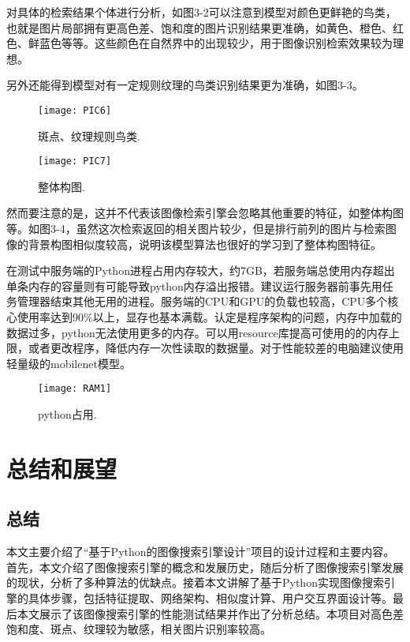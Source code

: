 \documentclass[bachelor_p]{hdu-thesis}
\begin{document}
对具体的检索结果个体进行分析，如图3-2可以注意到模型对颜色更鲜艳的鸟类，也就是图片局部拥有更高色差、饱和度的图片识别结果更准确，如黄色、橙色、红色、鲜蓝色等等。这些颜色在自然界中的出现较少，用于图像识别检索效果较为理想。

另外还能得到模型对有一定规则纹理的鸟类识别结果更为准确，如图3-3。

\begin{figure}[!htb]
  \centering
  \texttt{[image: PIC6]}
  \caption{斑点、纹理规则鸟类.}
  \label{fig_PIC6}
\end{figure}

\begin{figure}[!htb]
  \centering
  \texttt{[image: PIC7]}
  \caption{整体构图.}
  \label{fig_PIC7}
\end{figure}

然而要注意的是，这并不代表该图像检索引擎会忽略其他重要的特征，如整体构图等。如图3-4，虽然这次检索返回的相关图片较少，但是排行前列的图片与检索图像的背景构图相似度较高，说明该模型算法也很好的学习到了整体构图特征。

在测试中服务端的Python进程占用内存较大，约7GB，若服务端总使用内存超出单条内存的容量则有可能导致python内存溢出报错。建议运行服务器前事先用任务管理器结束其他无用的进程。服务端的CPU和GPU的负载也较高，CPU多个核心使用率达到90$\%$以上，显存也基本满载。认定是程序架构的问题，内存中加载的数据过多，python无法使用更多的内存。可以用resource库提高可使用的的内存上限，或者更改程序，降低内存一次性读取的数据量。对于性能较差的电脑建议使用轻量级的mobilenet模型。

\begin{figure}[!htb]
  \centering
  \texttt{[image: RAM1]}
  \caption{python占用.}
  \label{fig_RAM}
\end{figure}

\chapter{总结和展望}

\section{总结}

本文主要介绍了“基于Python的图像搜索引擎设计”项目的设计过程和主要内容。首先，本文介绍了图像搜索引擎的概念和发展历史，随后分析了图像搜索引擎发展的现状，分析了多种算法的优缺点。接着本文讲解了基于Python实现图像搜索引擎的具体步骤，包括特征提取、网络架构、相似度计算、用户交互界面设计等。最后本文展示了该图像搜索引擎的性能测试结果并作出了分析总结。本项目对高色差饱和度、斑点、纹理较为敏感，相关图片识别率较高。
\end{document}
